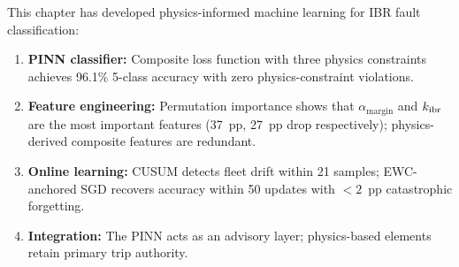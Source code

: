 This chapter has developed physics-informed machine learning for IBR
fault classification:
\begin{enumerate}
\item \textbf{PINN classifier:} Composite loss function with three
      physics constraints achieves 96.1\% 5-class accuracy with zero
      physics-constraint violations.
\item \textbf{Feature engineering:} Permutation importance shows
      that $\alpha_\mathrm{margin}$ and $k_\mathrm{ibr}$ are the most important
      features (37~pp, 27~pp drop respectively); physics-derived composite
      features are redundant.
\item \textbf{Online learning:} CUSUM detects fleet drift within
      21 samples; EWC-anchored SGD recovers accuracy within 50 updates
      with $< 2$~pp catastrophic forgetting.
\item \textbf{Integration:} The PINN acts as an advisory layer; physics-based
      elements retain primary trip authority.
\end{enumerate}
